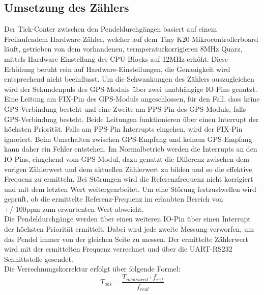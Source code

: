 \subsection{Umsetzung des Zählers} %
Der Tick-Conter zwischen den Pendeldurchgängen basiert auf einem Freilaufendem Hardware-Zähler, welcher auf dem Tiny K20 Mikrocontrollerboard läuft, getrieben von dem vorhandenen, termperaturkorrigieren 8MHz Quarz, mittels Hardware-Einstellung des CPU-Blocks auf 12MHz erhöht. Diese Erhöhung beruht rein auf Hardware-Einstellungen, die Genauigkeit wird entsprechend nicht beeinflusst.
Um die Schwankungen des Zählers auszugleichen wird der Sekundenpuls des GPS-Moduls über zwei unabhängige IO-Pins genutzt. Eine Leitung am FIX-Pin des GPS-Moduls angeschlossen, für den Fall, dass keine GPS-Verbindung besteht und eine Zweite am PPS-Pin des GPS-Moduls, falls GPS-Verbindung besteht.
Beide Leitungen funktionieren über einen Interrupt der höchsten Priorität. Falls am PPS-Pin Interrupts eingehen, wird der FIX-Pin ignoriert. Beim Umschalten zwischen GPS-Empfang und keinem GPS-Empfang kann daher ein Fehler entstehen. Im Normalbetrieb werden die Interrupts an den IO-Pins, eingehend vom GPS-Modul, dazu genutzt die Differenz zwischen dem vorigen Zählerwert und dem aktuellen Zählerwert zu bilden und so die effektive Frequenz zu ermitteln. Bei Störungen wird die Referenzfrequenz nicht korrigiert und mit dem letzten Wert weitergearbeitet. Um eine Störung festzustwellen wird geprüft, ob die ermittelte Referenz-Frequenz im erlaubten Bereich von +/-100ppm zum erwartenten Wert abweicht.\\ 
Die Pendeldurchgänge werden über einen weiteren IO-Pin über einen Interrupt der höchsten Priorität ermittelt. Dabei wird jede zweite Messung verworfen, um das Pendel immer von der gleichen Seite zu messen. Der ermittelte Zählerwert wird mit der ermittelten Frequenz verrechnet und über die UART-RS232 Schnittstelle gesendet.\\
Die Verrechnungskorrektur erfolgt über folgende Formel:
\[
	T_{abs} = \frac{T_{measured} \cdot f_{ref}}{f_{real}}
\]
